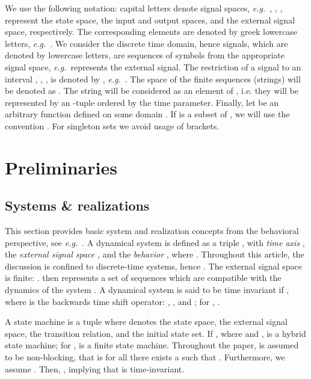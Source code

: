 \documentclass[a4paper, 10pt, conference]{ieeeconf}
\newcommand{\eg}{\emph{e.g.}~}
\begin{document}
We use the following notation: capital letters denote signal spaces, \eg , , ,  represent the state space,
the input and output spaces, and the external signal space, respectively. The corresponding elements are denoted by greek lowercase letters, \eg . We consider the discrete time domain, hence signals, which
are denoted by lowercase letters, are sequences of symbols from the appropriate signal space, \eg  represents the external signal. The restriction of a signal to an interval , , , is denoted by , \eg . The space of the finite sequences (strings)  will be denoted as . The string  will be considered as an element of , i.e. they will be represented by an -tu\-ple ordered by the time parameter. Finally, let  be an arbitrary function  defined on some domain . If  is a subset of , we will use the convention . For singleton sets we avoid usage of brackets. 






















\section{Preliminaries}
\label{sec:monolithic}


\subsection{Systems \& realizations}
\label{sec:monolithic_dynamic}
This section provides basic system and realization concepts from the behavioral perspective, see \eg \cite{Wi91}. A dynamical system  is defined as a triple , with \emph{time axis} , the \emph{external signal space} , and the \emph{behavior} , where .
Throughout this article, the discussion is confined to discrete-time systems, hence . The external signal space is finite: .  then represents a set of sequences  which are compatible with the dynamics of the system . A dynamical system  is said to be {time invariant} if , where  is the backwards time shift operator: , , and ; for ,  . 

A state machine is a tuple  where  denotes the state space,  the external signal space,  the transition relation, and  the initial state set. If , where  and ,  is a hybrid state machine; for ,  is a finite state machine. Throughout the paper,  is assumed to be non-blocking, that is for all  there exists a  such that . Furthermore, we assume . Then, , implying that  is time-invariant.
\end{document}
